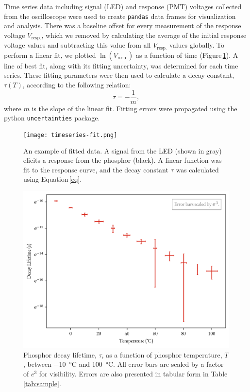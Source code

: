 \documentclass[12pt]{report}
\begin{document}
    Time series data including signal (LED) and response (PMT) voltages collected from the oscilloscope were used to create \texttt{pandas} data frames for visualization and analysis. There was a baseline offset for every measurement of the response voltage $V_{\mathrm{resp.}}$, which we removed by calculating the average of the initial response voltage values and subtracting this value from all $V_{\mathrm{resp.}}$ values globally. To perform a linear fit, we plotted $\ln(V_{\mathrm{resp.}})$ as a function of time (Figure\,\ref{fig:f1}). A line of best fit, along with its fitting uncertainty, was determined for each time series. These fitting parameters were then used to calculate a decay constant, $\tau(T)$, according to the following relation:
    \begin{equation}
        \tau = -\frac{1}{m}, \label{eq}
    \end{equation}
    where $m$ is the slope of the linear fit. Fitting errors were propagated using the python \texttt{uncertainties} package.

    \begin{figure}[tbh]
        \centering 
        \texttt{[image: timeseries-fit.png]} 
        \caption{An example of fitted data. A signal from the LED (shown in gray) elicits a response from the phosphor (black). A linear function was fit to the response curve, and the decay constant $\tau$ was calculated using Equation\,\ref{eq}.} 
        \label{fig:f1} 
    \end{figure}

    \begin{figure}[tbh] 
        \centering 
        \includegraphics[width=.7\linewidth]{image.png} 
        \caption{Phosphor decay lifetime, $\tau$, as a function of phosphor temperature, $T$, between \SI{-10}{\degreeCelsius} and \SI{100}{\degreeCelsius}. All error bars are scaled by a factor of $e^{3}$ for visibility. Errors are also presented in tabular form in Table \ref{tab:sample}.} \label{fig:fig2}
    \end{figure}
\end{document}
